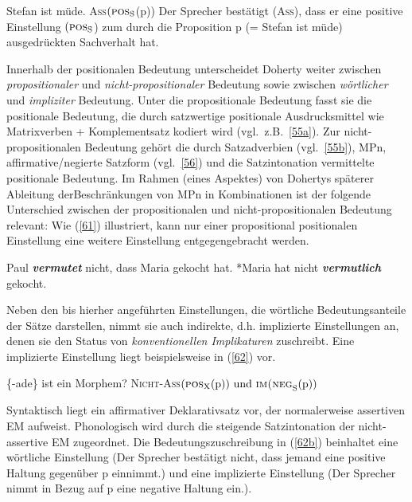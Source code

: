 \begin{exe}
	\ex\label{60} 
		\begin{xlist}	
			\ex\label{60a} Stefan ist müde.
			\ex\label{60b} \textsc{Ass}$(\textrm{\textsc{pos}}_{\textrm{S}}$(\textrm{p}))	
			\ex\label{60c} Der Sprecher bestätigt (\textsc{Ass}), dass er eine positive Einstellung $(\textrm{\textsc{pos}}_{\textrm{S}}$) zum durch die Proposition 				p (= Stefan ist müde) ausgedrückten Sachverhalt hat.
		\end{xlist}
\end{exe}
Innerhalb der positionalen Bedeutung unterscheidet Doherty weiter zwischen \textit{propositionaler} und \textit{nicht-propositionaler} Bedeutung  sowie zwischen \textit{wörtlicher} und  \textit{impliziter} Bedeutung. Unter die propositionale Bedeutung fasst sie die positionale Bedeutung, die durch satzwertige positionale Ausdrucksmittel wie Matrixverben + Komplementsatz kodiert wird (vgl.\ z.B.\ \ref{55a}). Zur nicht-propositio\-nalen Bedeutung gehört die durch Satzadverbien (vgl.\ \ref{55b}), MPn, affirmative/ne\-gierte Satzform (vgl.\ \ref{56}) und die Satzintonation vermittelte positionale Bedeutung. Im Rahmen (eines Aspektes) von Dohertys späterer Ableitung der\linebreak Beschränkungen von MPn in Kombinationen ist der folgende Unterschied zwischen der propositionalen und nicht-propositionalen Bedeutung relevant: Wie (\ref{61}) illustriert, kann nur einer propositional positionalen Einstellung eine weitere Einstellung entgegengebracht werden.\largerpage
\begin{exe}
	\ex\label{61} 
		\begin{xlist}	
			\ex\label{61a} Paul \textbf{\textit{vermutet}} nicht, dass Maria gekocht hat. 
			\ex\label{61b} *Maria hat nicht \textbf{\textit{vermutlich}} gekocht.	
		\end{xlist}
\end{exe}
Neben den bis hierher angeführten Einstellungen, die wörtliche Bedeutungsanteile der Sätze darstellen, nimmt sie auch indirekte, d.h. implizierte Einstellungen an, denen sie den Status von \textit{konventionellen Implikaturen} zuschreibt. Eine implizierte Einstellung liegt beispielsweise in (\ref{62}) vor.

\begin{exe}
	\ex\label{62} 
		\begin{xlist}	
			\ex\label{62a} \{-ade\} ist ein Morphem?
			\ex\label{62b} \textsc{Nicht-Ass}$(\textrm{\textsc{pos}}_{\textrm{X}}(\textrm{p})) \ \textrm{und} \ \textrm{\textsc{im(neg}}_{\textrm{S}}(\textrm{p}))$
		\end{xlist}
\end{exe}
Syntaktisch liegt ein affirmativer Deklarativsatz vor, der normalerweise assertiven EM aufweist. Phonologisch wird durch die steigende Satzintonation der nicht-assertive EM zugeordnet. Die Bedeutungszuschreibung in (\ref{62b}) beinhaltet eine wört\-liche Einstellung (Der Sprecher bestätigt nicht, dass jemand eine positive Haltung gegenüber p einnimmt.) und eine implizierte Einstellung (Der Sprecher nimmt in Bezug auf p eine negative Haltung ein.). 

